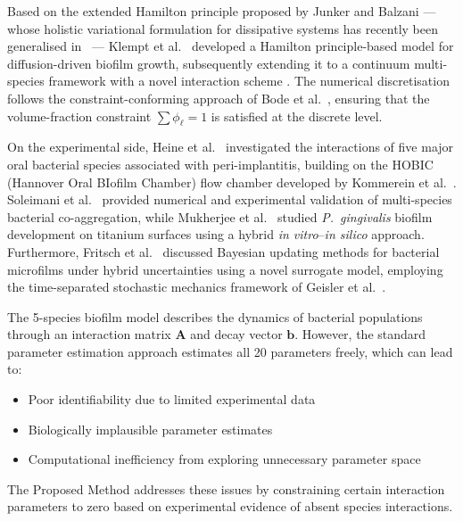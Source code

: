 \documentclass[11pt,a4paper]{article}
\begin{document}
Based on the extended Hamilton principle proposed by Junker and Balzani \cite{JunkerBalzani2021ExtendedHamilton} --- whose holistic variational formulation for dissipative systems has recently been generalised in~\cite{JunkerBodeHackl2025Holistic} --- Klempt et al.~\cite{Klempt2024ContinuumGrowth} developed a Hamilton principle-based model for diffusion-driven biofilm growth, subsequently extending it to a continuum multi-species framework with a novel interaction scheme \cite{Klempt2025ContinuumBiofilm}. The numerical discretisation follows the constraint-conforming approach of Bode et al.~\cite{Bode2025ConstraintConforming}, ensuring that the volume-fraction constraint $\sum\phi_\ell = 1$ is satisfied at the discrete level.

On the experimental side, Heine et al.~\cite{Heine2025PeriImplant} investigated the interactions of five major oral bacterial species associated with peri-implantitis, building on the HOBIC (Hannover Oral BIofilm Chamber) flow chamber developed by Kommerein et al.~\cite{Kommerein2018HOBIC}. Soleimani et al.~\cite{Soleimani2023CoAggregation} provided numerical and experimental validation of multi-species bacterial co-aggregation, while Mukherjee et al.~\cite{Mukherjee2025PgTitanium} studied \textit{P.~gingivalis} biofilm development on titanium surfaces using a hybrid \textit{in vitro}--\textit{in silico} approach. Furthermore, Fritsch et al.~\cite{Fritsch2025BayesianMicrofilms} discussed Bayesian updating methods for bacterial microfilms under hybrid uncertainties using a novel surrogate model, employing the time-separated stochastic mechanics framework of Geisler et al.~\cite{GeislerJunker2025TSM}.

The 5-species biofilm model describes the dynamics of bacterial populations through an interaction matrix $\mathbf{A}$ and decay vector $\mathbf{b}$. However, the standard parameter estimation approach estimates all 20 parameters freely, which can lead to:

\begin{itemize}
    \item Poor identifiability due to limited experimental data
    \item Biologically implausible parameter estimates
    \item Computational inefficiency from exploring unnecessary parameter space
\end{itemize}

The Proposed Method addresses these issues by constraining certain interaction parameters to zero based on experimental evidence of absent species interactions.
\end{document}
